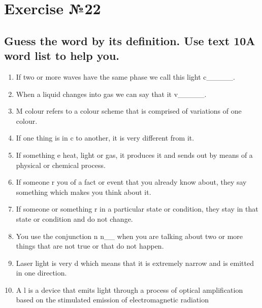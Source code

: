 \section*{Exercise №22}

\subsection*{Guess the word by its definition. Use text 10A word list to help you.}
\begin{enumerate}
      \item If two or more waves have the same phase we call this light c\_\_\_\_\_.
      \item When a liquid changes into gas we can say that it v\_\_\_\_\_.
      \item M\underline{\hspace{2cm}} colour refers to a colour scheme that is comprised of variations
            of one colour.
      \item If one thing is in c\underline{\hspace{2cm}} to another, it is very different from it.
      \item If something e\underline{\hspace{2cm}} heat, light or gas, it produces it and sends out
            by means of a physical or chemical process.
      \item If someone r\underline{\hspace{2cm}} you of a fact or event that you already know about,
            they say something which makes you think about it.
      \item If someone or something r\underline{\hspace{2cm}} in a particular state or condition,
            they stay in that state or condition and do not change.
      \item You use the conjunction n\underline{\hspace{2cm}} n\_\_ when you are talking about two
            or more things that are not true or that do not happen.
      \item Laser light is very d\underline{\hspace{2cm}} which means that it is extremely narrow
            and is emitted in one direction.
      \item A l\underline{\hspace{2cm}} is a device that emits light through a process of optical
            amplification based on the stimulated emission of electromagnetic radiation
\end{enumerate}

